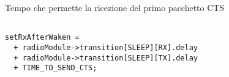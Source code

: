 \begin{listing}[h]
    \caption{Tempo che permette la ricezione del primo pacchetto CTS}
    \label{code:setRxAfterWaken}
    \begin{verbatim}

setRxAfterWaken = 
  + radioModule->transition[SLEEP][RX].delay
  + radioModule->transition[SLEEP][TX].delay
  + TIME_TO_SEND_CTS;

    \end{verbatim}
\end{listing}